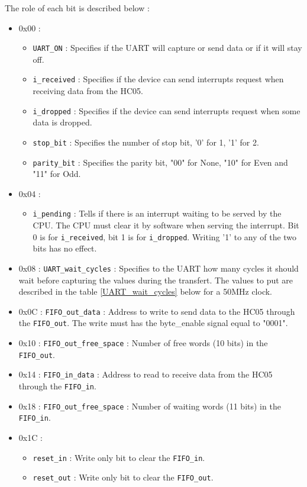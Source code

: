 \documentclass[11pt]{article}
\begin{document}
The role of each bit is described below :
\begin{itemize}
    \item 0x00 :
    \begin{itemize}
        \item \texttt{UART\_ON} : Specifies if the UART will capture or send data or if it will stay off.
        \item \texttt{i\_received} : Specifies if the device can send interrupts request when receiving data from the HC05.
        \item \texttt{i\_dropped} : Specifies if the device can send interrupts request when some data is dropped.
        \item \texttt{stop\_bit} : Specifies the number of stop bit, '0' for 1, '1' for 2.
        \item \texttt{parity\_bit} : Specifies the parity bit, "00" for None, "10" for Even and "11" for Odd.
    \end{itemize}
    \item 0x04 : 
    \begin{itemize}
        \item \texttt{i\_pending} : Tells if there is an interrupt waiting to be served by the CPU. The CPU must clear it by software when serving the interrupt. Bit 0 is for \texttt{i\_received}, bit 1 is for \texttt{i\_dropped}. Writing '1' to any of the two bits has no effect.
    \end{itemize}
    \item 0x08 : \texttt{UART\_wait\_cycles} : Specifies to the UART how many cycles it should wait before capturing the values during the transfert. The values to put are described in the table \ref{UART_wait_cycles} below for a 50MHz clock. 
    \item 0x0C : \texttt{FIFO\_out\_data} : Address to write to send data to the HC05 through the \texttt{FIFO\_out}. The write must has the byte\_enable signal equal to "0001".
    \item 0x10 : \texttt{FIFO\_out\_free\_space} : Number of free words (10 bits) in the \texttt{FIFO\_out}. 
    \item 0x14 : \texttt{FIFO\_in\_data} : Address to read to receive data from the HC05 through the \texttt{FIFO\_in}. 
    \item 0x18 : \texttt{FIFO\_out\_free\_space} : Number of waiting words (11 bits) in the \texttt{FIFO\_in}. 
    \item 0x1C :
    \begin{itemize}
        \item \texttt{reset\_in} : Write only bit to clear the \texttt{FIFO\_in}.
        \item \texttt{reset\_out} : Write only bit to clear the \texttt{FIFO\_out}.
    \end{itemize}
\end{itemize}
\end{document}
